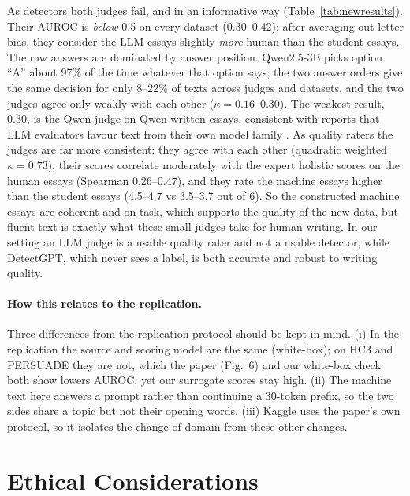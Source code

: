 \documentclass[11pt]{article}
\begin{document}
As detectors both judges fail, and in an informative way (Table~\ref{tab:newresults}). Their AUROC is \emph{below} 0.5 on every dataset (0.30--0.42): after averaging out letter bias, they consider the LLM essays slightly \emph{more} human than the student essays. The raw answers are dominated by answer position. Qwen2.5-3B picks option ``A'' about 97\% of the time whatever that option says; the two answer orders give the same decision for only 8--22\% of texts across judges and datasets, and the two judges agree only weakly with each other ($\kappa=0.16$--$0.30$). The weakest result, 0.30, is the Qwen judge on Qwen-written essays, consistent with reports that LLM evaluators favour text from their own model family \citep{panickssery2024self}. As quality raters the judges are far more consistent: they agree with each other (quadratic weighted $\kappa=0.73$), their scores correlate moderately with the expert holistic scores on the human essays (Spearman 0.26--0.47), and they rate the machine essays higher than the student essays (4.5--4.7 vs 3.5--3.7 out of 6). So the constructed machine essays are coherent and on-task, which supports the quality of the new data, but fluent text is exactly what these small judges take for human writing. In our setting an LLM judge is a usable quality rater and not a usable detector, while DetectGPT, which never sees a label, is both accurate and robust to writing quality.

\paragraph{How this relates to the replication.} Three differences from the replication protocol should be kept in mind. (i) In the replication the source and scoring model are the same (white-box); on HC3 and PERSUADE they are not, which the paper (Fig.~6) and our white-box check both show lowers AUROC, yet our surrogate scores stay high. (ii) The machine text here answers a prompt rather than continuing a 30-token prefix, so the two sides share a topic but not their opening words. (iii) Kaggle uses the paper's own protocol, so it isolates the change of domain from these other changes.

\section{Ethical Considerations}
\label{sec:ethics}
\end{document}
